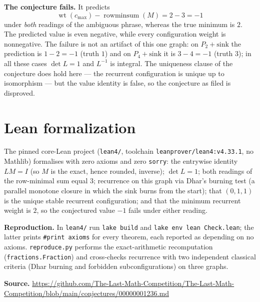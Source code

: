 \documentclass[11pt]{article}
\begin{document}
\textbf{The conjecture fails.} It predicts
\[
\operatorname{wt}(c_{\max})-\operatorname{rowminsum}(M)=2-3=-1
\]
under \emph{both} readings of the ambiguous phrase, whereas the true minimum
is $2$. The predicted value is even negative, while every configuration weight
is nonnegative. The failure is not an artifact of this one graph: on
$P_2+\text{sink}$ the prediction is $1-2=-1$ (truth $1$) and on
$P_4+\text{sink}$ it is $3-4=-1$ (truth $3$); in all these cases
$\det L=1$ and $L^{-1}$ is integral. The uniqueness clause of the conjecture
does hold here --- the recurrent configuration is unique up to isomorphism ---
but the value identity is false, so the conjecture as filed is disproved.

\section*{Lean formalization}
The pinned core-Lean project (\texttt{lean4/}, toolchain
\texttt{leanprover/lean4:v4.33.1}, no Mathlib) formalises with zero axioms and
zero \texttt{sorry}: the entrywise identity $LM=I$ (so $M$ is the exact, hence
rounded, inverse); $\det L=1$; both readings of the row-minimal sum equal
$3$; recurrence on this graph via Dhar's burning test (a parallel monotone
closure in which the sink burns from the start); that $(0,1,1)$ is the unique
stable recurrent configuration; and that the minimum recurrent weight is $2$,
so the conjectured value $-1$ fails under either reading.

\textbf{Reproduction.} In \texttt{lean4/} run \texttt{lake build} and
\texttt{lake env lean Check.lean}; the latter prints
\texttt{\#print~axioms} for every theorem, each reported as depending on no
axioms. \texttt{reproduce.py} performs the exact-arithmetic recomputation
(\texttt{fractions.Fraction}) and cross-checks recurrence with two independent
classical criteria (Dhar burning and forbidden subconfigurations) on three
graphs.

\textbf{Source.}
\url{https://github.com/The-Last-Math-Competition/The-Last-Math-Competition/blob/main/conjectures/00000001236.md}
\end{document}
